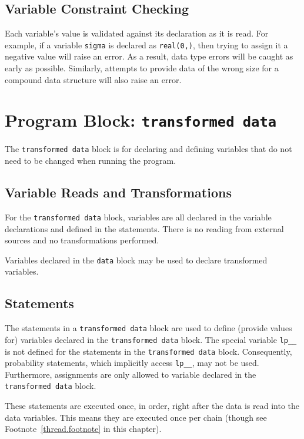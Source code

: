 \documentclass[10pt]{report}
\newcommand{\code}[1]{{\tt #1}}
\newcommand{\refnote}[1]{Footnote~\ref{#1.footnote}}
\begin{document}
\subsection{Variable Constraint Checking}

Each variable's value is validated against its declaration as it is
read.  For example, if a variable \code{sigma} is declared as
\code{real(0,)}, then trying to assign it a negative value will raise
an error.  As a result, data type errors will be caught as early as
possible.  Similarly, attempts to provide data of the wrong size for a
compound data structure will also raise an error.


\section{Program Block: \code{transformed data}}

The \code{transformed data} block is for declaring and defining
variables that do not need to be changed when running the program.  

\subsection{Variable Reads and Transformations}

For the \code{transformed data} block, variables are all declared in
the variable declarations and defined in the statements.  There is no
reading from external sources and no transformations performed.

Variables declared in the \code{data} block may be used to declare
transformed variables.

\subsection{Statements}

The statements in a \code{transformed data} block are used to define
(provide values for) variables declared in the \code{transformed data}
block.  The special variable \code{lp\_\_} is not defined for the
statements in the \code{transformed data} block.  Consequently,
probability statements, which implicitly access \code{lp\_\_}, may not
be used.  Furthermore, assignments are only allowed to variable
declared in the \code{transformed data} block.

These statements are executed once, in order, right after the data is
read into the data variables.  This means they are executed once per
chain (though see \refnote{thread} in this chapter).
\end{document}

